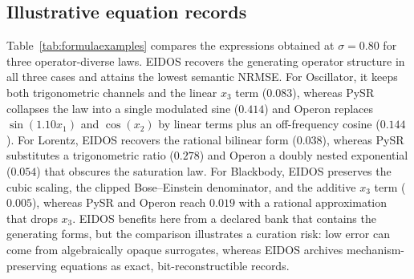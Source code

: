 \subsection{Illustrative equation records}\label{sec:casestudies}

Table~\ref{tab:formulaexamples} compares the expressions obtained at \(\sigma=0.80\) for three operator-diverse laws. EIDOS recovers the generating operator structure in all three cases and attains the lowest semantic NRMSE. For Oscillator, it keeps both trigonometric channels and the linear \(x_3\) term (\(0.083\)), whereas PySR collapses the law into a single modulated sine (\(0.414\)) and Operon replaces \(\sin(1.10x_1)\) and \(\cos(x_2)\) by linear terms plus an off-frequency cosine (\(0.144\)). For Lorentz, EIDOS recovers the rational bilinear form (\(0.038\)), whereas PySR substitutes a trigonometric ratio (\(0.278\)) and Operon a doubly nested exponential (\(0.054\)) that obscures the saturation law. For Blackbody, EIDOS preserves the cubic scaling, the clipped Bose--Einstein denominator, and the additive \(x_3\) term (\(0.005\)), whereas PySR and Operon reach \(0.019\) with a rational approximation that drops \(x_3\). EIDOS benefits here from a declared bank that contains the generating forms, but the comparison illustrates a curation risk: low error can come from algebraically opaque surrogates, whereas EIDOS archives mechanism-preserving equations as exact, bit-reconstructible records.

